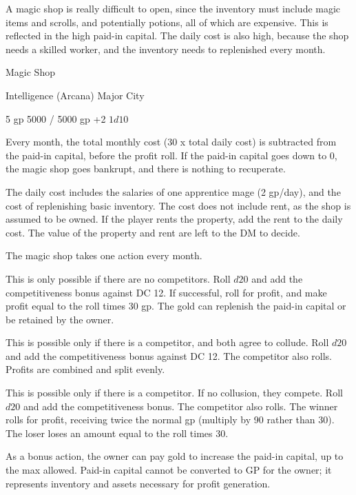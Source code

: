 \documentclass[twocolumn]{dndbook}
\begin{document}

A magic shop is really difficult to open, since the inventory must include magic items and scrolls, and potentially potions, all of which are expensive.
This is reflected in the high paid-in capital.
The daily cost is also high, because the shop needs a skilled worker, and the inventory needs to replenished every month.

\begin{DndMonster}[width=.5\textwidth - 8pt]{Magic Shop}

	\hfill Intelligence (Arcana)
	\hfill Major City

	\hfill 5 gp
	\hfill 5000 / 5000 gp
	\hfill +2
	\hfill $1d10$

	Every month, the total monthly cost (30 x total daily cost) is subtracted
	from the paid-in capital, before the profit roll.
	If the paid-in capital goes down to 0, the magic shop goes bankrupt,
	and there is nothing to recuperate.\par

	The daily cost includes the salaries of one apprentice mage (2 gp/day),
	and the cost of replenishing basic inventory.
	The cost does not include rent, as the shop is assumed to be owned.
	If the player rents the property, add the rent to the daily cost.
	The value of the property and rent are left to the DM to decide.\par

	The magic shop takes one action every month.

	This is only possible if there are no competitors.
	Roll $d20$ and add the competitiveness bonus against DC 12.
	If successful, roll for profit, and make profit equal to the roll
	times 30 gp. The gold can replenish the paid-in capital or be retained by the owner.

	This is possible only if there is a competitor, and both agree to collude.
	Roll $d20$ and add the competitiveness bonus against DC 12.
	The competitor also rolls. Profits are combined and split evenly.

	This is possible only if there is a competitor. If no collusion, they compete.
	Roll $d20$ and add the competitiveness bonus.
	The competitor also rolls.
	The winner rolls for profit, receiving twice the normal gp (multiply by 90 rather than 30).
	The loser loses an amount equal to the roll times 30.

	As a bonus action, the owner can pay gold to increase
	the paid-in capital, up to the max allowed.
	Paid-in capital cannot be converted to GP for the owner; it represents inventory and assets necessary for profit generation.
\end{DndMonster}
\end{document}
